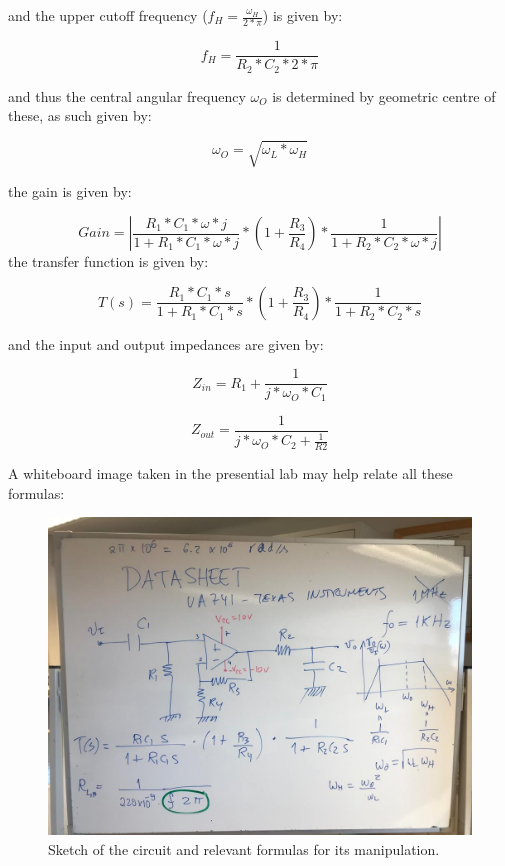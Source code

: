 and the upper cutoff frequency ($f_H = \frac{\omega_H}{2*\pi}$) is given by: 

\begin {equation}
	f_H = \frac{1}{R_2 *C_2* 2*\pi}  
	\label{eq:ucf}
\end{equation}

and thus the central angular frequency $\omega_O$ is determined by geometric centre of these, as such given by:

\begin {equation}
	\omega_O= \sqrt{\omega_L * \omega_H }  
	\label{eq:CentralF}
\end{equation}
 
the gain is given by:

\begin {equation}
	Gain= |\frac{R_1*C_1*\omega*j}{1+R_1*C_1*\omega*j}*(1+\frac{R_3}{R_4})*\frac{1}{1+R_2*C_2*\omega*j}|   	
	\label{eq:gain}
\end{equation} 
the transfer function is given by: 

\begin {equation}
	T(s) = \frac{R_1*C_1*s}{1+R_1*C_1*s}*(1+\frac{R_3}{R_4})*\frac{1}{1+R_2*C_2*s}   	
	\label{eq:gain}
\end{equation} 

and the input and output impedances are given by: 

\begin {equation}
	Z_{in} = R_1 + \frac{1}{j*\omega_O*C_1} 
	\label{eq:impedances_in}
\end{equation}  

\begin {equation}
       Z_{out} = \frac{1}{j*\omega_O*C_2+\frac{1}{R2}}	
	\label{eq:impedances_out}
\end{equation}  

A whiteboard image taken in the presential lab may help relate all these formulas:

\begin{figure}[h] \centering
\includegraphics[width=0.95\linewidth]{datasheet.jpeg}
\caption{Sketch of the circuit and relevant formulas for its manipulation.}
\label{fig:formulas}
\end{figure}




